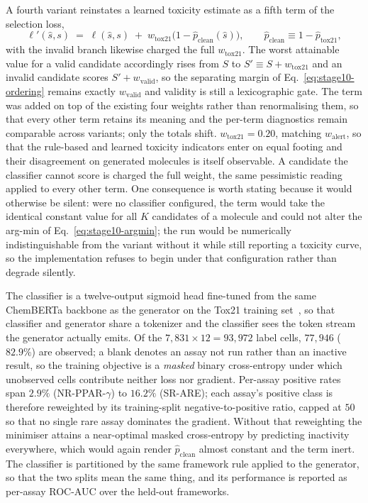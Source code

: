 \documentclass[a4paper,12pt]{article}
\begin{document}
A fourth variant reinstates a learned toxicity estimate as a fifth term of the
selection loss,
\begin{equation}
\ell'(\hat{s}, s) \;=\; \ell(\hat{s}, s)
\;+\; w_{\mathrm{tox21}}\bigl(1 - \hat{p}_{\mathrm{clean}}(\hat{s})\bigr),
\qquad
\hat{p}_{\mathrm{clean}} \equiv 1 - \hat{p}_{\mathrm{tox21}},
\label{eq:stage104-loss}
\end{equation}
with the invalid branch likewise charged the full $w_{\mathrm{tox21}}$. The
worst attainable value for a valid candidate accordingly rises from $S$ to $S'
\equiv S + w_{\mathrm{tox21}}$ and an invalid candidate scores $S' +
w_{\mathrm{valid}}$, so the separating margin of
Eq.~\eqref{eq:stage10-ordering} remains exactly $w_{\mathrm{valid}}$ and
validity is still a lexicographic gate. The term was added on top of the
existing four weights rather than renormalising them, so that every other term
retains its meaning and the per-term diagnostics remain comparable across
variants; only the totals shift. $w_{\mathrm{tox21}} = 0.20$, matching
$w_{\mathrm{alert}}$, so that the rule-based and learned toxicity indicators
enter on equal footing and their disagreement on generated molecules is itself
observable. A candidate the classifier cannot score is charged the full weight,
the same pessimistic reading applied to every other term. One consequence is
worth stating because it would otherwise be silent: were no classifier
configured, the term would take the identical constant value for all $K$
candidates of a molecule and could not alter the arg-min of
Eq.~\eqref{eq:stage10-argmin}; the run would be numerically indistinguishable
from the variant without it while still reporting a toxicity curve, so the
implementation refuses to begin under that configuration rather than degrade
silently.

The classifier is a twelve-output sigmoid head fine-tuned from the same
ChemBERTa backbone as the generator on the Tox21 training
set~\cite{huang2016tox21,tox21challenge}, so that classifier and generator share
a tokenizer and the classifier sees the token stream the generator actually
emits. Of the $7{,}831 \times 12 = 93{,}972$ label cells, $77{,}946$ ($82.9\%$)
are observed; a blank denotes an assay not run rather than an inactive result,
so the training objective is a \emph{masked} binary cross-entropy under which
unobserved cells contribute neither loss nor gradient. Per-assay positive rates
span $2.9\%$ (NR-PPAR-$\gamma$) to $16.2\%$ (SR-ARE); each assay's positive
class is therefore reweighted by its training-split negative-to-positive ratio,
capped at $50$ so that no single rare assay dominates the gradient. Without that
reweighting the minimiser attains a near-optimal masked cross-entropy by
predicting inactivity everywhere, which would again render
$\hat{p}_{\mathrm{clean}}$ almost constant and the term inert. The classifier is
partitioned by the same framework rule applied to the generator, so that the two
splits mean the same thing, and its performance is reported as per-assay ROC-AUC
over the held-out frameworks.
\end{document}
